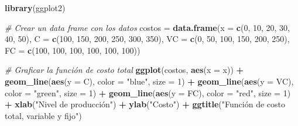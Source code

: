 \documentclass[
  spanish,
  12pt,
]{book}
\newenvironment{Shaded}{\begin{snugshade}}{\end{snugshade}}
\newcommand{\AttributeTok}[1]{\textcolor[rgb]{0.13,0.29,0.53}{#1}}
\newcommand{\CommentTok}[1]{\textcolor[rgb]{0.56,0.35,0.01}{\textit{#1}}}
\newcommand{\DecValTok}[1]{\textcolor[rgb]{0.00,0.00,0.81}{#1}}
\newcommand{\FunctionTok}[1]{\textcolor[rgb]{0.13,0.29,0.53}{\textbf{#1}}}
\newcommand{\NormalTok}[1]{#1}
\newcommand{\OtherTok}[1]{\textcolor[rgb]{0.56,0.35,0.01}{#1}}
\newcommand{\SpecialCharTok}[1]{\textcolor[rgb]{0.81,0.36,0.00}{\textbf{#1}}}
\newcommand{\StringTok}[1]{\textcolor[rgb]{0.31,0.60,0.02}{#1}}
\begin{document}
\begin{Shaded}
\begin{Highlighting}[]
\FunctionTok{library}\NormalTok{(ggplot2)}

\CommentTok{\# Crear un data frame con los datos}
\NormalTok{costos }\OtherTok{=} \FunctionTok{data.frame}\NormalTok{(}\AttributeTok{x =} \FunctionTok{c}\NormalTok{(}\DecValTok{0}\NormalTok{, }\DecValTok{10}\NormalTok{, }\DecValTok{20}\NormalTok{, }\DecValTok{30}\NormalTok{, }\DecValTok{40}\NormalTok{, }\DecValTok{50}\NormalTok{),}
                     \AttributeTok{C =} \FunctionTok{c}\NormalTok{(}\DecValTok{100}\NormalTok{, }\DecValTok{150}\NormalTok{, }\DecValTok{200}\NormalTok{, }\DecValTok{250}\NormalTok{, }\DecValTok{300}\NormalTok{, }\DecValTok{350}\NormalTok{),}
                     \AttributeTok{VC =} \FunctionTok{c}\NormalTok{(}\DecValTok{0}\NormalTok{, }\DecValTok{50}\NormalTok{, }\DecValTok{100}\NormalTok{, }\DecValTok{150}\NormalTok{, }\DecValTok{200}\NormalTok{, }\DecValTok{250}\NormalTok{),}
                     \AttributeTok{FC =} \FunctionTok{c}\NormalTok{(}\DecValTok{100}\NormalTok{, }\DecValTok{100}\NormalTok{, }\DecValTok{100}\NormalTok{, }\DecValTok{100}\NormalTok{, }\DecValTok{100}\NormalTok{, }\DecValTok{100}\NormalTok{))}

\CommentTok{\# Graficar la función de costo total}
\FunctionTok{ggplot}\NormalTok{(costos, }\FunctionTok{aes}\NormalTok{(}\AttributeTok{x =}\NormalTok{ x)) }\SpecialCharTok{+}
  \FunctionTok{geom\_line}\NormalTok{(}\FunctionTok{aes}\NormalTok{(}\AttributeTok{y =}\NormalTok{ C), }\AttributeTok{color =} \StringTok{"blue"}\NormalTok{, }\AttributeTok{size =} \DecValTok{1}\NormalTok{) }\SpecialCharTok{+}
  \FunctionTok{geom\_line}\NormalTok{(}\FunctionTok{aes}\NormalTok{(}\AttributeTok{y =}\NormalTok{ VC), }\AttributeTok{color =} \StringTok{"green"}\NormalTok{, }\AttributeTok{size =} \DecValTok{1}\NormalTok{) }\SpecialCharTok{+}
  \FunctionTok{geom\_line}\NormalTok{(}\FunctionTok{aes}\NormalTok{(}\AttributeTok{y =}\NormalTok{ FC), }\AttributeTok{color =} \StringTok{"red"}\NormalTok{, }\AttributeTok{size =} \DecValTok{1}\NormalTok{) }\SpecialCharTok{+}
  \FunctionTok{xlab}\NormalTok{(}\StringTok{"Nivel de producción"}\NormalTok{) }\SpecialCharTok{+}
  \FunctionTok{ylab}\NormalTok{(}\StringTok{"Costo"}\NormalTok{) }\SpecialCharTok{+}
  \FunctionTok{ggtitle}\NormalTok{(}\StringTok{"Función de costo total, variable y fijo"}\NormalTok{)}
\end{Highlighting}
\end{Shaded}
\end{document}

